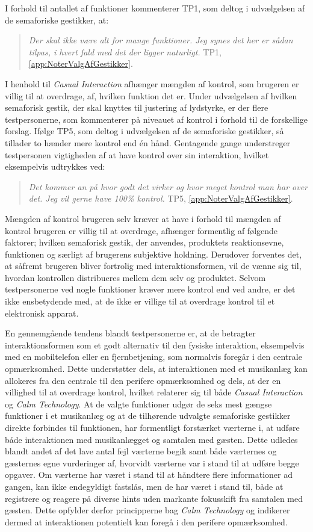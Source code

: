 I forhold til antallet af funktioner kommenterer TP1, som deltog i udvælgelsen af de semaforiske gestikker, at: 
%
\begin{quotation}
	\noindent
	\textit{Der skal ikke være alt for mange funktioner. Jeg synes det her er sådan tilpas, i hvert fald med det der ligger naturligt.} TP1, \autoref{app:NoterValgAfGestikker}.
\noindent
\end{quotation}
%
I henhold til \textit{Casual Interaction} afhænger mængden af kontrol, som brugeren er villig til at overdrage, af, hvilken funktion det er. Under udvælgelsen af hvilken semaforisk gestik, der skal knyttes til justering af lydstyrke, er der flere testpersonerne, som kommenterer på niveauet af kontrol i forhold til de forskellige forslag. Ifølge TP5, som deltog i udvælgelsen af de semaforiske gestikker, så tillader to hænder mere kontrol end én hånd. Gentagende gange understreger testpersonen vigtigheden af at have kontrol over sin interaktion, hvilket eksempelvis udtrykkes ved: 
%
\begin{quotation}
	\noindent
	\textit{Det kommer an på hvor godt det virker og hvor meget kontrol man har over det. Jeg vil gerne have 100\% kontrol.} TP5, \autoref{app:NoterValgAfGestikker}.
\noindent
\end{quotation}
%
Mængden af kontrol brugeren selv kræver at have i forhold til mængden af kontrol brugeren er villig til at overdrage, afhænger formentlig af følgende faktorer; hvilken semaforisk gestik, der anvendes, produktets reaktionsevne, funktionen og særligt af brugerens subjektive holdning. Derudover forventes det, at såfremt brugeren bliver fortrolig med interaktionsformen, vil de vænne sig til, hvordan kontrollen distribueres mellem dem selv og produktet. Selvom testpersonerne ved nogle funktioner kræver mere kontrol end ved andre, er det ikke ensbetydende med, at de ikke er villige til at overdrage kontrol til et elektronisk apparat. 

En gennemgående tendens blandt testpersonerne er, at de betragter interaktionsformen som et godt alternativ til den fysiske interaktion, eksempelvis med en mobiltelefon eller en fjernbetjening, som normalvis foregår i den centrale opmærksomhed. Dette understøtter dels, at interaktionen med et musikanlæg kan allokeres fra den centrale til den perifere opmærksomhed og dels, at der en villighed til at overdrage kontrol, hvilket relaterer sig til både \textit{Casual Interaction} og \textit{Calm Technology}. \blankline
%
At de valgte funktioner udgør de seks mest gængse funktioner i et musikanlæg og at de tilhørende udvalgte semaforiske gestikker direkte forbindes til funktionen, har formentligt forstærket værterne i, at udføre både interaktionen med musikanlægget og samtalen med gæsten. Dette udledes blandt andet af det lave antal fejl værterne begik samt både værternes og gæsternes egne vurderinger af, hvorvidt værterne var i stand til at udføre begge opgaver. Om værterne har været i stand til at håndtere flere informationer ad gangen, kan ikke endegyldigt fastslås, men de har været i stand til, både at registrere og reagere på diverse hints uden markante fokusskift fra samtalen med gæsten. Dette opfylder derfor principperne bag \textit{Calm Technology} og indikerer dermed at interaktionen potentielt kan foregå i den perifere opmærksomhed.

